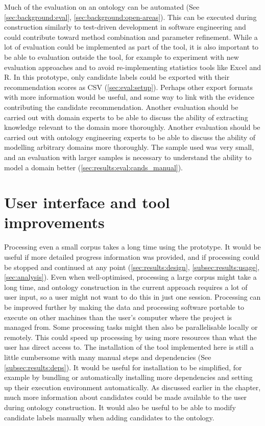 \documentclass[a4paper]{report}
\begin{document}
Much of the evaluation on an ontology can be automated (See \ref{sec:background:eval}, \ref{sec:background:open-areas}).
This can be executed during construction similarly to test-driven development in software engineering and could contribute toward method combination and parameter refinement.
While a lot of evaluation could be implemented as part of the tool, it is also important to be able to evaluation outside the tool, for example to experiment with new evaluation approaches and to avoid re-implementing statistics tools like Excel and R.
In this prototype, only candidate labels could be exported with their recommendation scores as CSV (\ref{sec:eval:setup}).
Perhaps other export formats with more information would be useful, and some way to link with the evidence contributing the candidate recommendation.
Another evaluation should be carried out with domain experts to be able to discuss the ability of extracting knowledge relevant to the domain more thoroughly.
Another evaluation should be carried out with ontology engineering experts to be able to discuss the ability of modelling arbitrary domains more thoroughly.
The sample used was very small, and an evaluation with larger samples is necessary to understand the ability to model a domain better (\ref{sec:results:eval:cands_manual}).


\section{User interface and tool improvements}

Processing even a small corpus takes a long time using the prototype.
It would be useful if more detailed progress information was provided, and if processing could be stopped and continued at any point (\ref{sec:results:design}, \ref{subsec:results:usage}, \ref{sec:analysis}).
Even when well-optimised, processing a large corpus might take a long time, and ontology construction in the current approach requires a lot of user input, so a user might not want to do this in just one session.
Processing can be improved further by making the data and processing software portable to execute on other machines than the user's computer where the project is managed from.
Some processing tasks might then also be parallelisable locally or remotely.
This could speed up processing by using more resources than what the user has direct access to.
The installation of the tool implemented here is still a little cumbersome with many manual steps and dependencies (See \ref{subsec:results:deps}).
It would be useful for installation to be simplified, for example by bundling or automatically installing more dependencies and setting up their execution environment automatically.
As discussed earlier in the chapter, much more information about candidates could be made available to the user during ontology construction.
It would also be useful to be able to modify candidate labels manually when adding candidates to the ontology.
\end{document}
